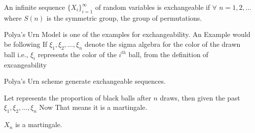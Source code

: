 \documentclass[a4paper,english,10pt]{article}
\begin{document}
\begin{defn}
An infinite sequence $\{X_i\}_{i=1}^{\infty}$ of random variables is exchangeable if $\forall$ $n=1,2,\dots$
where $S(n)$ is the symmetric group, the group of permutations.
\end{defn}
Polya's Urn Model is one of the examples for exchangeability. An Example would be following
If $\xi_1,\xi_2,\dots,\xi_n$ denote the sigma algebra for the color of the drawn ball i.e., $\xi_i$ represents the color of the $i^{th}$ ball, from the definition of excangeability
\begin{note}
Polya's Urn scheme generate exchangeable sequences.
\end{note}
Let 
represents the proportion of black balls after $n$ draws, then given the past $\xi_1,\xi_2,\dots,\xi_n$
Now
That means it is a martingale.
\begin{note}
$X_n$ is a martingale.
\end{note}
\end{document}
